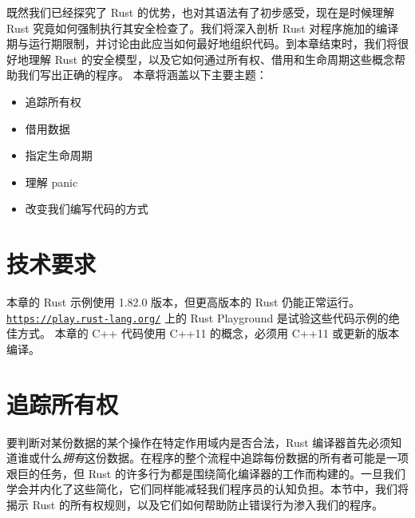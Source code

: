 既然我们已经探究了 Rust 的优势，也对其语法有了初步感受，现在是时候理解 Rust 究竟如何强制执行其安全检查了。我们将深入剖析 Rust 对程序施加的编译期与运行期限制，并讨论由此应当如何最好地组织代码。到本章结束时，我们将很好地理解 Rust 的安全模型，以及它如何通过所有权、借用和生命周期这些概念帮助我们写出正确的程序。
本章将涵盖以下主要主题：
\begin{itemize}
  \item 追踪所有权
  \item 借用数据
  \item 指定生命周期
  \item 理解 panic
  \item 改变我们编写代码的方式
\end{itemize}
\section{技术要求}
本章的 Rust 示例使用 1.\allowbreak{}82.\allowbreak{}0 版本，但更高版本的 Rust 仍能正常运行。\href{https://play.rust-lang.org/}{\texttt{https:/\allowbreak{}/\allowbreak{}play.\allowbreak{}rust-\allowbreak{}lang.\allowbreak{}org/\allowbreak{}}} 上的 Rust Playground 是试验这些代码示例的绝佳方式。
本章的 C++ 代码使用 C++11 的概念，必须用 C++11 或更新的版本编译。
\section{追踪所有权}
\label{idx:idx_53f08b8b}
要判断对某份数据的某个操作在特定作用域内是否合法，Rust 编译器首先必须知道谁或什么\emph{拥有}这份数据。在程序的整个流程中追踪每份数据的所有者可能是一项艰巨的任务，但 Rust 的许多行为都是围绕简化编译器的工作而构建的。一旦我们学会并内化了这些简化，它们同样能减轻我们程序员的认知负担。本节中，我们将揭示 Rust 的所有权规则，以及它们如何帮助防止错误行为渗入我们的程序。
